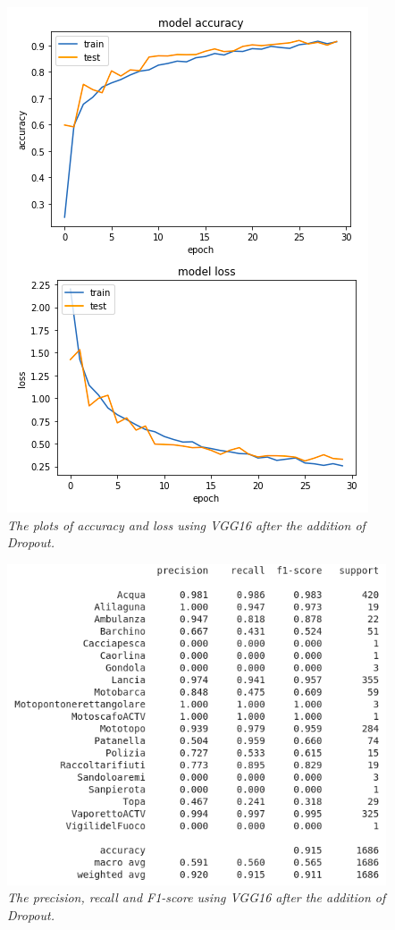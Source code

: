 \documentclass[12pt,a4paper]{report}
\begin{document}
\begin{figure}[H]
\centering
\includegraphics[scale=0.4]{./immagini/vgg16/2_data_augmentation_-_30_epochs_no_stopping_-_dropout_0p5_-_no_batch_norm/plot_loss_accuracy.png}
\caption{\textit{The plots of accuracy and loss using VGG16 after the addition of Dropout.}}
\end{figure}
\begin{figure}[H]
\centering
\includegraphics[scale=0.4]{./immagini/vgg16/2_data_augmentation_-_30_epochs_no_stopping_-_dropout_0p5_-_no_batch_norm/f1.png}
\caption{\textit{The precision, recall and F1-score using VGG16 after the addition of Dropout.}}
\end{figure}
\end{document}

